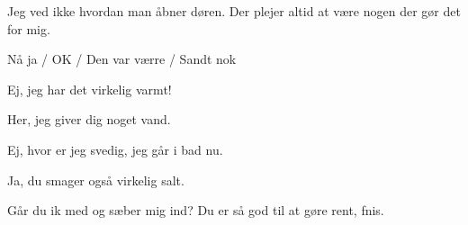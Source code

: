 \documentclass[a4paper,11pt]{article}
\begin{document}
\begin{sketch}
 Jeg ved ikke hvordan man åbner døren. Der plejer altid at være nogen der gør det for mig.


 Nå ja / OK / Den var værre / Sandt nok


 Ej, jeg har det virkelig varmt!

 Her, jeg giver dig noget vand.


 Ej, hvor er jeg svedig, jeg går i bad nu.

  Ja, du smager også virkelig salt.

 Går du ik med og sæber mig ind? Du er så god til at gøre rent, fnis.

\end{sketch}
\end{document}
